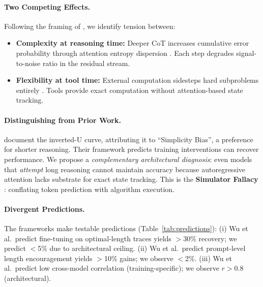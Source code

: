 \documentclass{article}
\theoremstyle{plain}
\theoremstyle{definition}
\theoremstyle{remark}
\begin{document}
\paragraph{Two Competing Effects.} Following the framing of \citet{kim2025masked}, we identify tension between:
\begin{itemize}[leftmargin=*,itemsep=1pt]
\item \textbf{Complexity at reasoning time:} Deeper CoT increases cumulative error probability through attention entropy dispersion \citep{gong2024attention,barbero2024oversquash}. Each step degrades signal-to-noise ratio in the residual stream.
\item \textbf{Flexibility at tool time:} External computation sidesteps hard subproblems entirely \citep{gao2023pal,gou2024tora,pan2024logiclm}. Tools provide exact computation without attention-based state tracking.
\end{itemize}

\paragraph{Distinguishing from Prior Work.} \citet{wu2025more} document the inverted-U curve, attributing it to ``Simplicity Bias'', a preference for shorter reasoning. Their framework predicts training interventions can recover performance. We propose a \emph{complementary architectural diagnosis}: even models that \emph{attempt} long reasoning cannot maintain accuracy because autoregressive attention lacks substrate for exact state tracking. This is the \textbf{Simulator Fallacy} \citep{bender2020climbing}: conflating token prediction with algorithm execution.

\paragraph{Divergent Predictions.} The frameworks make testable predictions (Table~\ref{tab:predictions}): (i) Wu et al.\ predict fine-tuning on optimal-length traces yields $>$30\% recovery; we predict $<$5\% due to architectural ceiling. (ii) Wu et al.\ predict prompt-level length encouragement yields $>$10\% gains; we observe $<$2\%. (iii) Wu et al.\ predict low cross-model correlation (training-specific); we observe $r>0.8$ (architectural).
\end{document}
